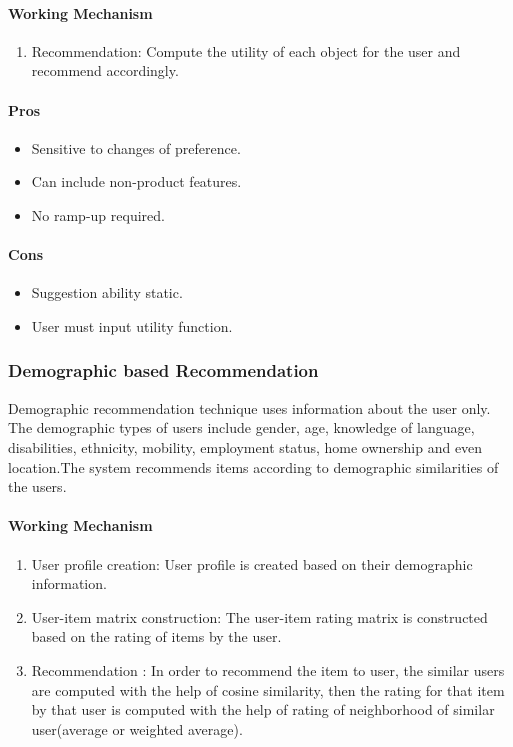 \paragraph{Working Mechanism}\hfill
\begin{enumerate}
	\item Recommendation: Compute the utility of each object for the user and recommend accordingly. 
\end{enumerate}
\paragraph{Pros}\hfill

\begin{itemize}
	\item Sensitive to changes of preference.
	\item Can include non-product features.
	\item No ramp-up required.
\end{itemize}
\paragraph{Cons}\hfill

\begin{itemize}
	\item Suggestion ability static.
	\item User must input utility function.
\end{itemize}

\subsubsection{Demographic based Recommendation}
Demographic recommendation technique \cite{demographic} uses information about the user only. The demographic types of users include gender, age, knowledge of language, disabilities, ethnicity, mobility, employment status, home  ownership and even location.The system recommends items according to demographic similarities of the users.
\paragraph{Working Mechanism}\hfill
\begin{enumerate}
	\item User profile creation: User profile is created based on their demographic information.
	\item User-item matrix construction: The user-item rating matrix is constructed based on the rating of items by the user.
	\item Recommendation : In order to recommend the item to user, the similar users are computed with the help of cosine similarity, then the rating for that item by that user is computed with the help of rating of neighborhood of similar user(average or weighted average).
\end{enumerate}

